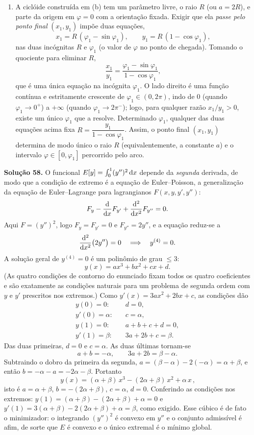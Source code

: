 \begin{enumerate}[label=(\alph*)]
\item A ciclóide construída em (b) tem um parâmetro livre, o raio $R$ (ou
$a=2R$), e parte da origem em $\varphi=0$ com a orientação fixada. Exigir que ela
\emph{passe pelo ponto final} $(x_1,y_1)$ impõe duas equações,
\[
    x_1=R\,(\varphi_1-\sin\varphi_1),
    \qquad
    y_1=R\,(1-\cos\varphi_1),
\]
nas duas incógnitas $R$ e $\varphi_1$ (o valor de $\varphi$ no ponto de chegada).
Tomando o quociente para eliminar $R$,
\[
    \frac{x_1}{y_1}=\frac{\varphi_1-\sin\varphi_1}{1-\cos\varphi_1},
\]
que é uma única equação na incógnita $\varphi_1$. O lado direito é uma função
contínua e estritamente crescente de $\varphi_1\in(0,2\pi)$, indo de $0$ (quando
$\varphi_1\to0^+$) a $+\infty$ (quando $\varphi_1\to2\pi^-$); logo, para qualquer
razão $x_1/y_1>0$, existe um único $\varphi_1$ que a resolve. Determinado
$\varphi_1$, qualquer das duas equações acima fixa $R=\dfrac{y_1}{1-\cos\varphi_1}$.
Assim, o ponto final $(x_1,y_1)$ determina de modo único o raio $R$ (equivalentemente,
a constante $a$) e o intervalo $\varphi\in[0,\varphi_1]$ percorrido pelo arco.
\end{enumerate}

\bigskip\noindent\textbf{Solução 58.}\quad
O funcional $E[y]=\int_0^1 (y'')^2\,\mathrm{d} x$ depende da \emph{segunda} derivada, de
modo que a condição de extremo é a equação de Euler--Poisson, a generalização da
equação de Euler--Lagrange para lagrangianos $F(x,y,y',y'')$:
\[
    F_y-\frac{\mathrm{d}}{\mathrm{d} x}F_{y'}+\frac{\mathrm{d}^2}{\mathrm{d} x^2}F_{y''}=0 .
\]
Aqui $F=(y'')^2$, logo $F_y=F_{y'}=0$ e $F_{y''}=2y''$, e a equação reduz-se a
\[
    \frac{\mathrm{d}^2}{\mathrm{d} x^2}\bigl(2y''\bigr)=0
    \quad\Longrightarrow\quad
    y^{(4)}=0 .
\]
A solução geral de $y^{(4)}=0$ é um polinômio de grau $\le 3$:
\[
    y(x)=ax^3+bx^2+cx+d .
\]
(As quatro condições de contorno do enunciado fixam todos os quatro coeficientes
e são exatamente as condições naturais para um problema de segunda ordem com
$y$ e $y'$ prescritos nos extremos.) Como $y'(x)=3ax^2+2bx+c$, as condições dão
\[
    \begin{aligned}
    y(0)=0:&\quad d=0,\\
    y'(0)=\alpha:&\quad c=\alpha,\\
    y(1)=0:&\quad a+b+c+d=0,\\
    y'(1)=\beta:&\quad 3a+2b+c=\beta.
    \end{aligned}
\]
Das duas primeiras, $d=0$ e $c=\alpha$. As duas últimas tornam-se
\[
    a+b=-\alpha,
    \qquad
    3a+2b=\beta-\alpha .
\]
Subtraindo o dobro da primeira da segunda, $a=(\beta-\alpha)-2(-\alpha)=\alpha+\beta$,
e então $b=-\alpha-a=-2\alpha-\beta$. Portanto
\[
    \boxed{\,y(x)=(\alpha+\beta)\,x^3-(2\alpha+\beta)\,x^2+\alpha\,x\,},
\]
isto é $a=\alpha+\beta$, $b=-(2\alpha+\beta)$, $c=\alpha$, $d=0$. Conferindo as
condições nos extremos: $y(1)=(\alpha+\beta)-(2\alpha+\beta)+\alpha=0$ e
$y'(1)=3(\alpha+\beta)-2(2\alpha+\beta)+\alpha=\beta$, como exigido. Esse cúbico é
de fato o minimizador: o integrando $(y'')^2$ é convexo em $y''$ e o conjunto
admissível é afim, de sorte que $E$ é convexo e o único extremal é o mínimo
global.
